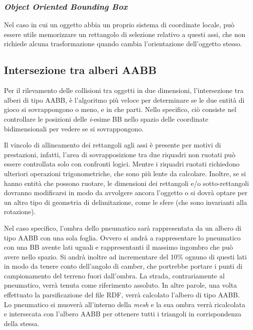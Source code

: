 \subsubsection{\textit{Object Oriented Bounding Box}}
Nel caso in cui un oggetto abbia un proprio sistema di coordinate locale, può essere utile memorizzare un rettangolo di selezione relativo a questi assi, che non richiede alcuna trasformazione quando cambia l'orientazione dell'oggetto stesso.

\subsection{Intersezione tra alberi AABB}
Per il rilevamento delle collisioni tra oggetti in due dimensioni, l'intersezione tra alberi di tipo \ac{AABB}, è l'algoritmo più veloce per determinare se le due entità di gioco si sovrappongono o meno, e in che parti. Nello specifico, ciò consiste nel controllare le posizioni delle \textit{i}-esime \ac{BB} nello spazio delle coordinate bidimensionali per vedere se si sovrappongono.

Il vincolo di allineamento dei rettangoli agli assi è presente per motivi di prestazioni, infatti, l'area di sovrapposizione tra due riquadri non ruotati può essere controllata solo con confronti logici. Mentre i riquadri ruotati richiedono ulteriori operazioni trigonometriche, che sono più lente da calcolare. Inoltre, se si hanno entità che possono ruotare, le dimensioni dei rettangoli e/o sotto-rettangoli dovranno modificarsi in modo da avvolgere ancora l'oggetto o si dovrà optare per un altro tipo di geometria di delimitazione, come le sfere (che sono invarianti alla rotazione).

Nel caso specifico, l'ombra dello pneumatico sarà rappresentata da un albero di tipo \ac{AABB} con una sola foglia. Ovvero si andrà a rappresentare lo pneumatico con una \ac{BB} avente lati uguali e rappresentanti il massimo ingombro che può avere nello spazio. Si andrà inoltre ad incrementare del 10\% ognuno di questi lati in modo da tenere conto dell'angolo di camber, che portrebbe portare i punti di campionamento del terreno fuori dall'ombra. La strada, contrariamente al pneumatico, verrà tenuta come riferimento assoluto. In altre parole, una volta effettuato la parsificazione del file \ac{RDF}, verrà calcolato l'albero di tipo \ac{AABB}. Lo pneumatico si muoverà all'interno della \textit{mesh} e la sua ombra verrà ricalcolata e intersecata con l'albero \ac{AABB} per ottenere tutti i triangoli in corrispondenza della stessa.

